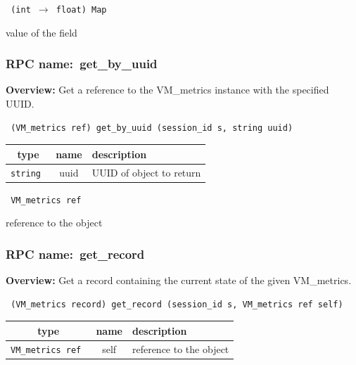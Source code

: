 \vspace{0.3cm}

{\tt 
(int $\rightarrow$ float) Map
}


value of the field
\vspace{0.3cm}
\vspace{0.3cm}
\vspace{0.3cm}
\subsubsection{RPC name:~get\_by\_uuid}

{\bf Overview:} 
Get a reference to the VM\_metrics instance with the specified UUID.

\begin{verbatim} (VM_metrics ref) get_by_uuid (session_id s, string uuid)\end{verbatim}



 
\vspace{0.3cm}
\begin{tabular}{|c|c|p{7cm}|}
 \hline
{\bf type} & {\bf name} & {\bf description} \\ \hline
{\tt string } & uuid & UUID of object to return \\ \hline 

\end{tabular}

\vspace{0.3cm}

{\tt 
VM\_metrics ref
}


reference to the object
\vspace{0.3cm}
\vspace{0.3cm}
\vspace{0.3cm}
\subsubsection{RPC name:~get\_record}

{\bf Overview:} 
Get a record containing the current state of the given VM\_metrics.

\begin{verbatim} (VM_metrics record) get_record (session_id s, VM_metrics ref self)\end{verbatim}



 
\vspace{0.3cm}
\begin{tabular}{|c|c|p{7cm}|}
 \hline
{\bf type} & {\bf name} & {\bf description} \\ \hline
{\tt VM\_metrics ref } & self & reference to the object \\ \hline 

\end{tabular}

